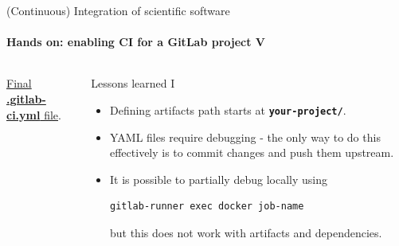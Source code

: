 \begin{frame}[fragile]{(Continuous) Integration of scientific software} 
    \framesubtitle{Hands on: enabling CI for a GitLab project V} 
    \vfill

    \begin{columns}
        \begin{column}[c]{0.5\textwidth}
    \href{https://gitlab.com/tmaric/minimal-cse-ci-examples/-/blob/01-with-ci/.gitlab-ci.yml}{Final \textbf{.gitlab-ci.yml} file}. 
        \end{column}
        \begin{column}[c]{0.5\textwidth}
            Lessons learned I
            \begin{itemize}
                \item Defining artifacts path starts at \textbf{\texttt{your-project/}}.
                \item YAML files require debugging - the only way to do this effectively is to commit changes and push them upstream.
                \item It is possible to partially debug locally using 
                    \begin{verbatim}
gitlab-runner exec docker job-name
                    \end{verbatim}
                    but this does not work with artifacts and dependencies.
            \end{itemize}
        \end{column}
    \end{columns}

\end{frame}

